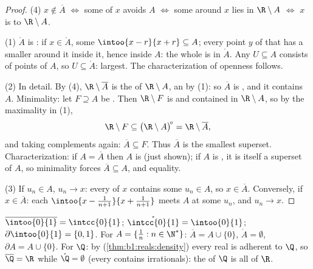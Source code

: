 \begin{proof}
(4) $x \notin \overline A$ $\iff$ some  of $x$ avoids $A$
$\iff$ some  around $x$ lies in $\R \setminus A$ $\iff$ $x$
is  to $\R \setminus A$.

(1) $\mathring A$ is : if $x \in \mathring A$, some
$\intoo{x-r}{x+r} \subseteq A$; every point $y$ of that  has
a smaller  around it inside it, hence inside $A$: the whole
 is in $\mathring A$. Any  $U \subseteq A$ consists of
 points of $A$, so $U \subseteq \mathring A$: largest. The
characterization of openness follows.

(2) In detail. By (4), $\R \setminus \overline A$ is the 
of $\R \setminus A$, an  by (1): so $\overline A$ is
, and it contains $A$. Minimality: let $F \supseteq A$ be
. Then $\R \setminus F$ is  and contained in $\R
\setminus A$, so by the maximality in (1),
\[
\R \setminus F \subseteq \bigl(\R \setminus A\bigr)^{\!\circ}
= \R \setminus \overline A ,
\]
and taking complements again: $\overline A \subseteq F$. Thus
$\overline A$ is the smallest  superset. Characterization:
if $A = \overline A$ then $A$ is  (just shown); if $A$ is
, it is itself a  superset of $A$, so minimality
forces $\overline A \subseteq A$, and equality.

(3) If $u_n \in A$, $u_n \to x$: every  of $x$ contains
some $u_n \in A$, so $x \in \overline A$. Conversely, if $x \in
\overline A$: each  $\intoo{x - \frac{1}{n+1}}{x +
\frac{1}{n+1}}$ meets $A$ at some $u_n$, and $u_n \to x$.
\end{proof}

\begin{example}\label{ex:b1:topology:closureexamples}
$\overline{\intoo{0}{1}} = \intcc{0}{1}$;
$\mathring{\intcc{0}{1}} = \intoo{0}{1}$; $\partial\intoo{0}{1} =
\{0, 1\}$. For $A = \{\frac 1n : n \in \N^*\}$: $\overline A = A
\cup \{0\}$, $\mathring A = \emptyset$, $\partial A = A \cup \{0\}$.
For $\Q$: by  (\cref{thm:b1:reals:density}) every real is
adherent to $\Q$, so $\overline{\Q} = \R$ while $\mathring{\Q} =
\emptyset$ (every  contains irrationals): the  of
$\Q$ is all of $\R$.
\end{example}


